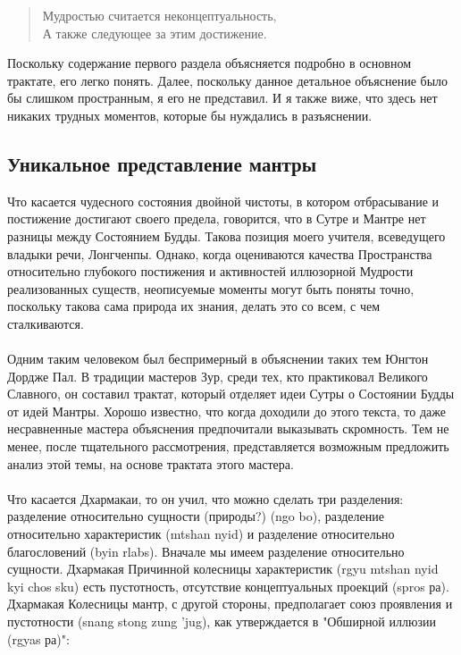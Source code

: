 \begin{verse}
Мудростью считается неконцептуальность,\\
А также следующее за этим достижение.\\
\end{verse}

\begin{siderules}
Поскольку содержание первого раздела объясняется подробно в основном трактате, его
легко понять. Далее, поскольку данное детальное объяснение было бы слишком
пространным, я его не представил. И я также виже, что здесь нет никаких трудных моментов,
которые бы нуждались в разъяснении.
\end{siderules}

\subsection{Уникальное представление мантры}

Что касается чудесного состояния двойной чистоты, в котором отбрасывание и
постижение достигают своего предела, говорится, что в Сутре и Мантре нет разницы между
Состоянием Будды. Такова позиция моего учителя, всеведущего владыки речи, Лонгченпы.
Однако, когда оцениваются качества Пространства относительно глубокого постижения и
активностей иллюзорной Мудрости реализованных существ, неописуемые моменты могут
быть поняты точно, поскольку такова сама природа их знания, делать это со всем, с чем
сталкиваются.\\
\\
Одним таким человеком был беспримерный в объяснении таких тем Юнгтон Дордже
Пал. В традиции мастеров Зур, среди тех, кто практиковал Великого Славного, он составил
трактат, который отделяет идеи Сутры о Состоянии Будды от идей Мантры. Хорошо
известно, что когда доходили до этого текста, то даже несравненные мастера объяснения
предпочитали выказывать скромность. Тем не менее, после тщательного рассмотрения,
представляется возможным предложить анализ этой темы, на основе трактата этого мастера.\\
\\
Что касается Дхармакаи, то он учил, что можно сделать три разделения: разделение
относительно сущности (природы?) (ngo bo), разделение относительно характеристик
(mtshan nyid) и разделение относительно благословений (byin rlabs). Вначале мы имеем
разделение относительно сущности. Дхармакая Причинной колесницы характеристик (rgyu
mtshan nyid kyi chos sku) есть пустотность, отсутствие концептуальных проекций (spros ра).
Дхармакая Колесницы мантр, с другой стороны, предполагает союз проявления и
пустотности (snang stong zung 'jug), как утверждается в "Обширной иллюзии (rgyas ра)":

